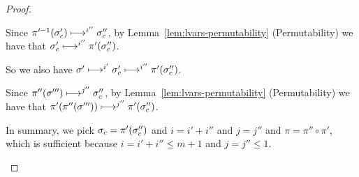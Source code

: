\begin{proof}
\begin{itemize}
    Since $\pi'^{-1}(\sigma'_c) \longmapsto^{i''} \sigma_c''$, by
    Lemma~\ref{lem:lvars-permutability} (Permutability) we have that
    $\sigma'_c \longmapsto^{i''} \pi'(\sigma_c'')$.

    So we also have $\sigma' \longmapsto^{i'} \sigma_c'
    \longmapsto^{i''} \pi'(\sigma_c'')$.

    Since $\pi''(\sigma''') \longmapsto^{j''} \sigma_c''$, by
    Lemma~\ref{lem:lvars-permutability} (Permutability) we have that
    $\pi'(\pi''(\sigma''')) \longmapsto^{j''} \pi'(\sigma_c'')$.

    In summary, we pick $\sigma_c = \pi'(\sigma_c'')$ and $i = i' + i''$
    and $j = j''$ and $\pi = \pi'' \circ \pi'$, which is sufficient
    because $i = i' + i'' \leq m + 1$ and $j = j'' \leq 1$.
  \end{itemize}

 \end{proof}
